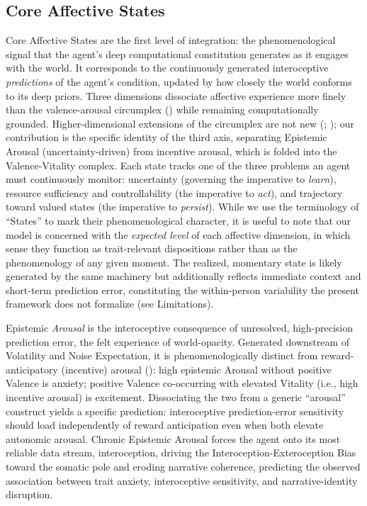 \documentclass[
  jou,
  floatsintext,
  longtable,
  nolmodern,
  notxfonts,
  notimes,
  12pt,
  colorlinks=true,linkcolor=blue,citecolor=blue,urlcolor=blue]{apa7}
\begin{document}
\subsection{Core Affective States}\label{core-affective-states}

Core Affective States are the first level of integration: the
phenomenological signal that the agent's deep computational constitution
generates as it engages with the world. It corresponds to the
continuously generated interoceptive \emph{predictions} of the agent's
condition, updated by how closely the world conforms to its deep priors.
Three dimensions dissociate affective experience more finely than the
valence-arousal circumplex
() while remaining
computationally grounded. Higher-dimensional extensions of the
circumplex are not new (; ); our
contribution is the specific identity of the third axis, separating
Epistemic Arousal (uncertainty-driven) from incentive arousal, which is
folded into the Valence-Vitality complex. Each state tracks one of the
three problems an agent must continuously monitor: uncertainty
(governing the imperative to \emph{learn}), resource sufficiency and
controllability (the imperative to \emph{act}), and trajectory toward
valued states (the imperative to \emph{persist}). While we use the
terminology of ``States'' to mark their phenomenological character, it
is useful to note that our model is concerned with the \emph{expected
level} of each affective dimension, in which sense they function as
trait-relevant dispositions rather than as the phenomenology of any
given moment. The realized, momentary state is likely generated by the
same machinery but additionally reflects immediate context and
short-term prediction error, constituting the within-person variability
the present framework does not formalize (see Limitations).

Epistemic \emph{Arousal} is the interoceptive consequence of unresolved,
high-precision prediction error, the felt experience of world-opacity.
Generated downstream of Volatility and Noise Expectation, it is
phenomenologically distinct from reward-anticipatory (incentive) arousal
(): high epistemic
Arousal without positive Valence is anxiety; positive Valence
co-occurring with elevated Vitality (i.e., high incentive arousal) is
excitement. Dissociating the two from a generic ``arousal'' construct
yields a specific prediction: interoceptive prediction-error sensitivity
should load independently of reward anticipation even when both elevate
autonomic arousal. Chronic Epistemic Arousal forces the agent onto its
most reliable data stream, interoception, driving the
Interoception-Exteroception Bias toward the somatic pole and eroding
narrative coherence, predicting the observed association between trait
anxiety, interoceptive sensitivity, and narrative-identity disruption.
\end{document}
